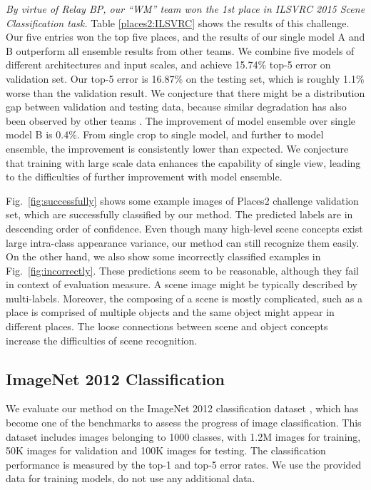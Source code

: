 \documentclass[runningheads]{llncs}
\begin{document}
{\it By virtue of Relay BP, our ``WM'' team won the 1st place in ILSVRC 2015 Scene Classification task.} Table \ref{places2:ILSVRC} shows the results of this challenge. Our five entries won the top five places, and the results of our single model A and B outperform all ensemble results from other teams. We combine five models of different architectures and input scales, and achieve 15.74\% top-5 error on validation set. Our top-5 error is 16.87\% on the testing set, which is roughly 1.1\% worse than the validation result. We conjecture that there might be a distribution gap between validation and testing data, because similar degradation has also been observed by other teams \cite{zhou_2015}. The improvement of model ensemble over single model B is 0.4\%. From single crop to single model, and further to model ensemble, the improvement is consistently lower than expected. We conjecture that training with large scale data enhances the capability of single view, leading to the difficulties of further improvement with model ensemble.

Fig.~\ref{fig:successfully} shows some example images of Places2 challenge validation set, which are successfully classified by our method.
The predicted labels are in descending order of confidence. Even though many high-level scene concepts exist large intra-class appearance variance, our method can still recognize them easily. On the other hand, we also show some incorrectly classified examples in Fig.~\ref{fig:incorrectly}. These predictions seem to be reasonable, although they fail in context of evaluation measure.
A scene image might be typically described by multi-labels. Moreover, the composing of a scene is mostly complicated, such as a place is comprised of multiple objects and the same object might appear in different places. The loose connections between scene and object concepts increase the difficulties of scene recognition.



\subsection{ImageNet 2012 Classification}
\label{experiment:imagenet}
We evaluate our method on the ImageNet 2012 classification dataset \cite{russakovsky_ijcv2015}, which has become one of the benchmarks to assess the progress of image classification. This dataset includes images belonging to 1000 classes, with 1.2M images for training, 50K images for validation and 100K images for testing. The classification performance is measured by the top-1 and top-5 error rates. We use the provided data for training models, do not use any additional data.
\end{document}

